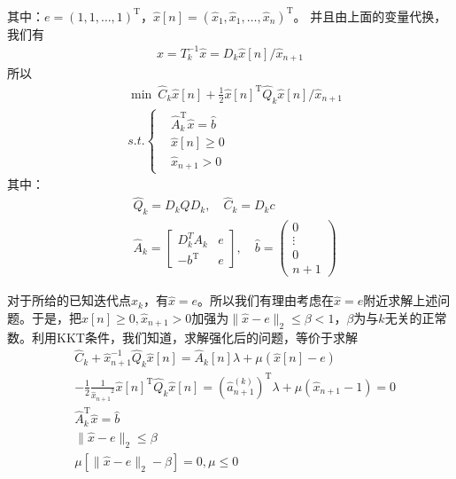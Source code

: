         其中：$e=(1,1,\ldots,1)^\mathrm{T} $，$\hat{x}[n]=({\hat{x}}_1,{\hat{x}}_1,\ldots,{\hat{x}}_n)^\mathrm{T} $。
        并且由上面的变量代换，我们有
        \begin{align*}
        x=T_k^{-1}{\hat{x}}=D_k\hat{x}[n]/{\hat{x}}_{n+1}
        \end{align*}
        所以
        \begin{align*}
        &\mathop {\min}\ {\hat{C}}_{k}{\hat{x}}[n]+\frac 12 {\hat{x}}[n]^\mathrm{T} {\hat{Q}}_k{\hat{x}}[n]/{\hat{x}}_{n+1}\\
        &s.t.\left\{
        \begin{aligned}
        &{\hat{A}}_k^\mathrm{T}  {\hat{x}} = \hat{b}\\
        &\hat{x}[n] \geqslant 0\\
        &{\hat{x}}_{n+1}>0
        \end{aligned}
        \right.
        \end{align*}
        其中：
        \begin{align*}
        &{\hat{Q}}_k=D_kQD_k,\quad {\hat{C}}_k=D_kc\\
        &{\hat{A}}_k = \begin{bmatrix}D_k^TA_k&e\\-b^\mathrm{T} &e \end{bmatrix},\quad
        {\hat{b}}=\begin{pmatrix}0\\\vdots\\0\\n+1 \end{pmatrix}
        \end{align*}
        \par
        对于所给的已知迭代点$x_k$，有$\hat{x}=e$。所以我们有理由考虑在$\hat{x}=e$附近求解上述问题。于是，把$\hat{x}[n] \geqslant 0,{\hat{x}}_{n+1}>0$加强为$\|\hat{x}-e\|_2 \leqslant \beta < 1$，$\beta$为与$k$无关的正常数。利用KKT条件，我们知道，求解强化后的问题，等价于求解
        \begin{align}
        &{\hat{C}}_k+{\hat{x}}_{n+1}^{-1}{\hat{Q}}_k{\hat{x}}[n]={\hat{A}}_k[n]\lambda+\mu({\hat{x}}[n]-e)\label{eqa}\\
        &-\frac 12 \frac {1}{{{\hat{x}}_{n+1}}^{2}}{\hat{x}}[n]^\mathrm{T} {\hat{Q}}_k{\hat{x}}[n]=\left( {\hat{a}}_{n+1}^{(k)} \right) ^\mathrm{T} \lambda + \mu({\hat{x}}_{n+1}-1)=0\label{eqb}\\
        &{\hat{A}}_k^\mathrm{T}  {\hat{x}} = {\hat{b}}\label{eqc}\\
        &\|\hat{x}-e\|_2 \leqslant \beta \label{eqd}\\
        &\mu\left[\|\hat{x}-e\|_2 - \beta \right] = 0,\mu \leqslant 0\label{eqe}
        \end{align}
